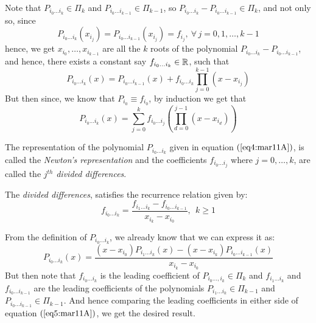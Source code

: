 Note that $P_{i_0\dots i_k} \in \Pi_k$ and $P_{i_0 \dots i_{k-1}} \in \Pi_{k-1}$, so $P_{i_0 \dots i_k} - P_{i_0 \dots i_{k-1}} \in \Pi_k$, and not only so, since 
\[
    P_{i_0 \dots i_k}(x_{i_j}) = P_{i_0 \dots i_{k-1}}(x_{i_j}) = f_{i_j}, \ \forall \, j = 0,1,\dots,k-1
\]  
hence, we get $x_{i_0}, \dots, x_{i_{k-1}}$ are all the $k$ roots of the polynomial $P_{i_0 \dots i_k} - P_{i_0\dots i_{k-1}}$, and hence, there exists a constant say $f_{i_0\dots i_k} \in \mathbb{R}$, such that 
\[
    P_{i_0\dots i_k}(x) = P_{i_0 \dots i_{k-1}}(x) + f_{i_0\dots i_k} \prod_{j=0}^{k-1} (x - x_{i_j})  
\]
But then since, we know that $P_{i_0} \equiv f_{i_0}$, by induction we get that 
\begin{equation}\label{eq4:mar11A}
    P_{i_0 \dots i_k}(x) = \sum_{j=0}^k f_{i_0 \dots i_j} \left(\prod_{d=0}^{j-1}(x-x_{i_d}) \right)
\end{equation} 

\begin{defn}\label{defn1:mar11A}
    The representation of the polynomial $P_{i_0 \dots i_k}$ given in equation $(\ref{eq4:mar11A})$, is called the \textit{Newton's representation} and the coefficients $f_{i_0 \dots i_j}$ where $j = 0, \dots, k$, are called the $j^{th}$ \textit{divided differences}.
\end{defn}

\begin{thm}\label{thm1:mar11A}
    The \textit{divided differences}, satisfies the recurrence relation given by:
    \[
        f_{i_0 \dots i_k} = \frac{f_{i_1 \dots i_k} - f_{i_0 \dots i_{k-1}}}{x_{i_k} - x_{i_0}}, \ \ k \geq 1  
    \]
\end{thm}
\begin{prf}
    From the definition of $P_{i_0\dots i_k}$, we already know that we can express it as: 
    \begin{equation}\label{eq5:mar11A}
        P_{i_0\dots i_k}(x) = \frac{(x-x_{i_0})P_{i_1\dots i_k}(x) - (x-x_{i_k})P_{i_0\dots i_{k-1}}(x)}{x_{i_k} - x_{i_0}} 
    \end{equation}
    But then note that $f_{i_0\dots i_k}$ is the leading coefficient of $P_{i_0\dots, i_k} \in \Pi_k$ and $f_{i_1\dots i_k}$ and $f_{i_0\dots i_{k-1}}$ are the leading coefficients of the polynomials $P_{i_1 \dots i_k} \in \Pi_{k-1}$ and $P_{i_0\dots i_{k-1}} \in \Pi_{k-1}$. And hence comparing the leading coefficients in either side of equation $(\ref{eq5:mar11A})$, we get the desired result.
\end{prf}

